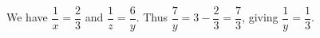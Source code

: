 We have $\dfrac{1}{x}=\dfrac{2}{3}$ and $\dfrac{1}{z}=\dfrac{6}{y}$. Thus $\dfrac{7}{y}=3-\dfrac{2}{3}=\dfrac{7}{3}$, giving $\boxed{\dfrac{1}{y}=\dfrac{1}{3}}$.
